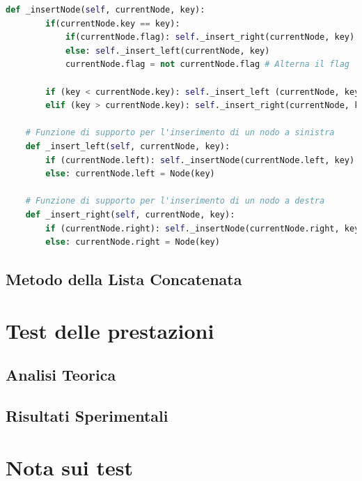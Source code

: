 \documentclass{article}
\begin{document}
\begin{lstlisting}[language=Python]
    def _insertNode(self, currentNode, key):        
        if(currentNode.key == key):
            if(currentNode.flag): self._insert_right(currentNode, key)
            else: self._insert_left(currentNode, key)
            currentNode.flag = not currentNode.flag # Alterna il flag
    
        if (key < currentNode.key): self._insert_left (currentNode, key)
        elif (key > currentNode.key): self._insert_right(currentNode, key)

    # Funzione di supporto per l'inserimento di un nodo a sinistra
    def _insert_left(self, currentNode, key):
        if (currentNode.left): self._insertNode(currentNode.left, key)
        else: currentNode.left = Node(key)

    # Funzione di supporto per l'inserimento di un nodo a destra
    def _insert_right(self, currentNode, key):
        if (currentNode.right): self._insertNode(currentNode.right, key)
        else: currentNode.right = Node(key)
\end{lstlisting}











\subsection{Metodo della Lista Concatenata}
\label{subsec:list-implementation}




\section{Test delle prestazioni}
\subsection{Analisi Teorica}
\subsection{Risultati Sperimentali}
\newpage

\section*{Nota sui test}
\end{document}
